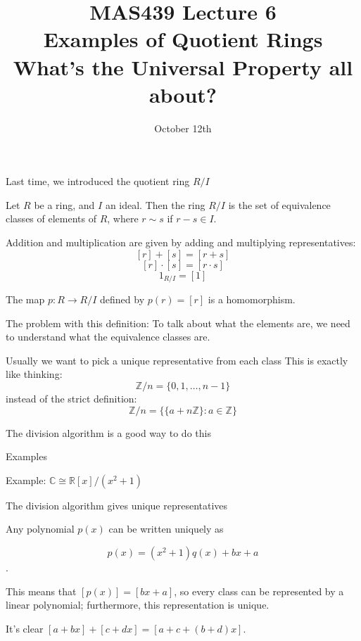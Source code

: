 \documentclass{beamer}
\title{MAS439 Lecture 6 \\ Examples of Quotient Rings \\ What's the Universal Property all about?}
\date{October 12th}
\newcommand{\C}{\mathbb{C}}
\newcommand{\Z}{\mathbb{Z}}
\newcommand{\R}{\mathbb{R}}
\begin{document}
\begin{frame}
\titlepage
\end{frame}

\begin{frame}{Last time, we introduced the quotient ring $R/I$}
  \begin{definition} Let $R$ be a ring, and $I$ an ideal.  Then the ring $R/I$ is the set of equivalence classes of elements of $R$, where $r\sim s$ if $r-s\in I$.

    Addition and multiplication are given by adding and multiplying representatives:
    $$[r]+[s]=[r+s]$$
    $$[r]\cdot [s]=[r\cdot s]$$
    $$1_{R/I}=[1]$$
  \end{definition}

  \begin{lemma}The map $p:R\to R/I$ defined by $p(r)=[r]$ is a homomorphism.
  \end{lemma}
  \end{frame}

\begin{frame}{The problem with this definition:}
  To talk about what the elements are, we need to understand what the equivalence classes are.

  \begin{block}{Usually we want to pick a unique representative from each class}
    This is exactly like thinking:
    $$\Z/n=\{0,1,\dots, n-1\}$$
    instead of the strict definition:
    $$\Z/n=\Big\{\{a+n\Z\} : a\in \Z\Big\}$$
    \end{block}
  \begin{block}{The division algorithm is a good way to do this}
    \end{block}


  \end{frame}



\begin{frame}[plain,c]

\begin{center}

\Huge

Examples
\end{center}

\end{frame}


\begin{frame}{Example: $\C\cong\R[x]/(x^2+1)$}

\begin{block}{The division algorithm gives unique representatives}

Any polynomial $p(x)$ can be written uniquely as

 $$p(x)=(x^2+1)q(x)+bx+a$$. 

This means that $[p(x)]=[bx+a]$, so every class can be represented by a linear polynomial; furthermore, this representation is unique.
\end{block}

It's clear $[a+bx]+[c+dx]=[a+c+(b+d)x]$.
\end{frame}
\end{document}
